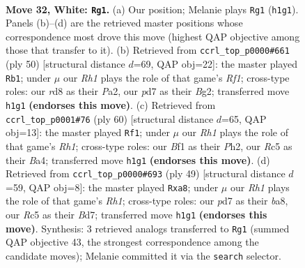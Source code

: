 \documentclass[11pt]{article}
\begin{document}
\clearpage

\begin{figure}[p]\centering
\begin{subfigure}{0.46\textwidth}\centering
\resizebox{\linewidth}{!}{%
\newchessgame
\chessboard[
  setfen={1r1r4/pb1p1pk1/8/2R1p3/6P1/8/PP1n1P2/2BK1B1R w - - 1 32},
  showmover=false,
  pgfstyle=straightmove, color=movearrow, markmove={h1-g1}
]}
\caption{}
\end{subfigure}\hfill
\begin{subfigure}{0.46\textwidth}\centering
\resizebox{\linewidth}{!}{%
\newchessgame
\chessboard[
  setfen={2r4r/1pbR3p/2p2k2/p4p2/5P2/2P5/P3P1BP/5RK1 w - - 2 26},
  showmover=false,
  pgfstyle=straightmove, color=movearrow, markmove={f1-b1}
]}
\caption{}
\end{subfigure}
\\[4pt]
\begin{subfigure}{0.46\textwidth}\centering
\resizebox{\linewidth}{!}{%
\newchessgame
\chessboard[
  setfen={3r4/R7/3r1p1k/8/BP1npb1p/P7/1B4PP/1K5R w - - 0 31},
  showmover=false,
  pgfstyle=straightmove, color=movearrow, markmove={h1-f1}
]}
\caption{}
\end{subfigure}\hfill
\begin{subfigure}{0.46\textwidth}\centering
\resizebox{\linewidth}{!}{%
\newchessgame
\chessboard[
  setfen={B6r/3bkp2/1B4pb/p7/P4p1p/8/1PP4P/1K1R3R b - - 0 25},
  showmover=false,
  pgfstyle=straightmove, color=movearrow, markmove={h8-a8}
]}
\caption{}
\end{subfigure}
\caption{\textbf{Move 32, White: \texttt{Rg1}.} (a) Our position; Melanie plays \texttt{Rg1} (\texttt{h1g1}). Panels (b)--(d) are the retrieved master positions whose correspondence most drove this move (highest QAP objective among those that transfer to it). (b) Retrieved from \texttt{ccrl\_top\_p0000\#661} (ply 50) [structural distance $d$=69, QAP obj=22]: the master played \texttt{Rb1}; under $\mu$ our \emph{Rh1} plays the role of that game's \emph{Rf1}; cross-type roles: our \emph{r}d8 as their \emph{P}a2, our \emph{p}d7 as their \emph{B}g2; transferred move \texttt{h1g1} \textbf{(endorses this move)}. (c) Retrieved from \texttt{ccrl\_top\_p0001\#76} (ply 60) [structural distance $d$=65, QAP obj=13]: the master played \texttt{Rf1}; under $\mu$ our \emph{Rh1} plays the role of that game's \emph{Rh1}; cross-type roles: our \emph{B}f1 as their \emph{P}h2, our \emph{R}c5 as their \emph{B}a4; transferred move \texttt{h1g1} \textbf{(endorses this move)}. (d) Retrieved from \texttt{ccrl\_top\_p0000\#693} (ply 49) [structural distance $d$=59, QAP obj=8]: the master played \texttt{Rxa8}; under $\mu$ our \emph{Rh1} plays the role of that game's \emph{Rh1}; cross-type roles: our \emph{p}d7 as their \emph{b}a8, our \emph{R}c5 as their \emph{B}d7; transferred move \texttt{h1g1} \textbf{(endorses this move)}. Synthesis: 3 retrieved analogs transferred to \texttt{Rg1} (summed QAP objective 43, the strongest correspondence among the candidate moves); Melanie committed it via the \texttt{search} selector.}
\label{fig:thought-m62}
\end{figure}
\end{document}
